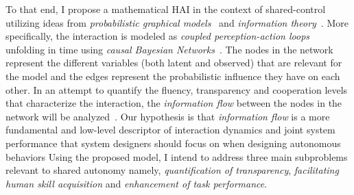 \documentclass[12pt]{article}
\newcommand{\DGc}[1]{{\textbf{\color{blue}{#1}}}}
\renewcommand{\sout}[1]{\unskip}
\begin{document}
To that end, I propose a mathematical \sout{framework that models}HAI in the context of shared-control utilizing ideas from \textit{probabilistic graphical models}~\cite{koller2009probabilistic} and \textit{information theory}~\cite{cover2012elements}. More specifically, the interaction is modeled as \textit{coupled perception-action loops} unfolding in time using \textit{causal Bayesian Networks}~\cite{pearl2009causality}. The nodes in the network represent the different variables (both latent and observed) that are relevant for the model and the edges represent the probabilistic influence they have on each other. In an attempt to quantify the fluency, transparency and cooperation levels that characterize the interaction, the \textit{information flow} between the nodes in the network will be analyzed~\cite{ay2008information}.  \sout{ Within this proposed framework of causal Bayesian networks, design of autonomy can be thought of as appropriately timed \textit{interventions} that have the potential to alter bidirectional information flow between human and autonomy.}
Our hypothesis is that \textit{information flow} is a more fundamental and low-level descriptor of interaction dynamics and joint system performance that system designers should focus on when designing autonomous behaviors 
Using the proposed model, I intend to address three main subproblems relevant to shared autonomy namely, \textit{quantification of transparency}, \textit{facilitating human skill acquisition} and \textit{enhancement of task performance}.
\end{document}
